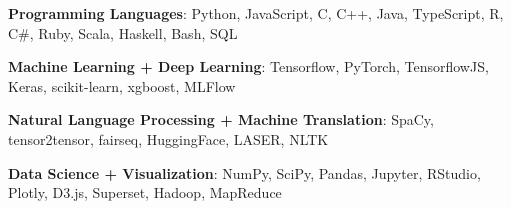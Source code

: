 
\textbf{Programming Languages}: Python, JavaScript, C, C++, Java, TypeScript, R, C\#, Ruby, Scala, Haskell, Bash, SQL %

\textbf{Machine Learning + Deep Learning}: Tensorflow, PyTorch, TensorflowJS, Keras, scikit-learn, xgboost, MLFlow %

\textbf{Natural Language Processing + Machine Translation}: SpaCy, tensor2tensor, fairseq, HuggingFace, LASER, NLTK %


\textbf{Data Science + Visualization}: NumPy, SciPy, Pandas, Jupyter, RStudio, Plotly, D3.js, Superset, Hadoop, MapReduce %








